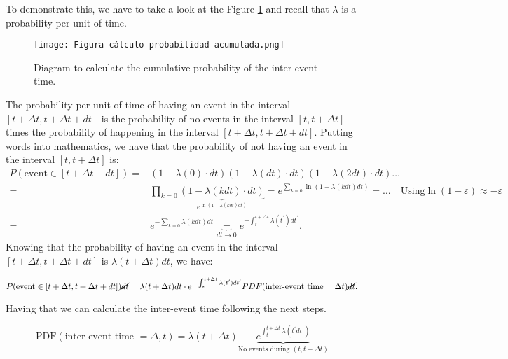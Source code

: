 To demonstrate this, we have to take a look at the Figure \ref{f: Figura calculo probabilidad acumulada} and recall that $\lambda$ is a probability per unit of time.

\begin{figure}[H]
    \centering
    \texttt{[image: Figura cálculo probabilidad acumulada.png]}
    \caption{Diagram to calculate the cumulative probability of the inter-event time.}
    \label{f: Figura calculo probabilidad acumulada}
\end{figure}

The probability per unit of time of having an event in the interval $[t+\Delta t,t+\Delta t+dt]$ is the probability of no events in the interval $[t,t+\Delta t]$ times the probability 
of happening in the interval $[t+\Delta t,t+\Delta t+ dt]$. Putting words into mathematics, we have that the probability of not having an event in the interval $[t,t+\Delta t]$ is:
\begin{equation}
    \begin{split}
        P(\text{event}\in [t+\Delta t+dt])=& \left(1-\lambda(0)\cdot dt \right)\left(1-\lambda(dt)\cdot dt \right)\left(1-\lambda(2dt)\cdot dt \right)\ldots\\
        =& \prod_{k=0}\underbrace{\left(1 -\lambda(k dt)\cdot dt \right)}_{e^{\ln \left(1-\lambda(k dt)dt \right)}}=e^{\sum_{k=0}\ln \left(1-\lambda(k dt) dt \right)}= \ldots\quad \text{Using}  \ln(1-\varepsilon)\approx -\varepsilon\\
        =& e^{-\sum_{k=0}\lambda(kdt)dt}\underbrace{=}_{dt\to 0}e^{-\int_{t}^{t+\Delta t}\lambda(t^\prime)dt^\prime}.
    \end{split}
    \label{eq: probability of no events}
\end{equation} 
Knowing that the probability of having an event in the interval $[t+\Delta t,t+\Delta t+dt]$ is $\lambda(t+\Delta t)dt$, we have:

\begin{equation}
P(\text{event}\in [t+\Delta t,t+\Delta t+dt])\cancel{dt}= \lambda(t+\Delta t)dt\cdot e^{-\int_{t}^{t+\Delta t}\lambda(t^\prime)dt^\prime}PDF(\text{inter-event time}=\Delta t)\cancel{dt}.
\label{eq: probability of having an event}
\end{equation}

Having that we can calculate the inter-event time following the next steps. 

$$ \text{PDF}\left( \text{inter-event time } = \Delta,t \right) = \lambda(t+\Delta t)\underbrace{e^{\int_{t}^{t+\Delta t}\lambda(t^{\prime}dt^\prime)}}_{\text{No events during }(t,t+\Delta t)}$$

